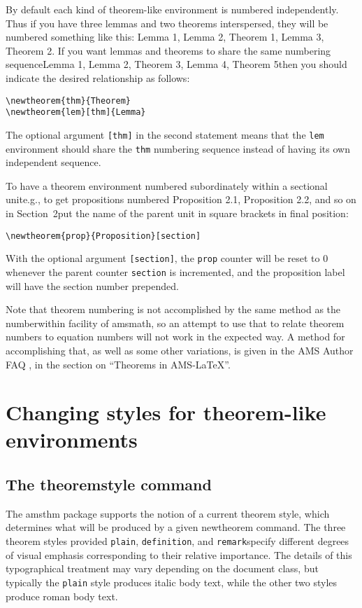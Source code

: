 \documentclass[twoside]{article}
\providecommand{\qq}[1]{\textquotedblleft#1\textquotedblright}
\providecommand{\mdash}{\textemdash\penalty\hyphenpenalty}
\newcommand{\ntt}{%
  \fontfamily\ttdefault \fontseries\mddefault \fontshape\updefault
  \selectfont
}
\DeclareRobustCommand{\cn}[1]{{\ntt\bslchar#1}}
\DeclareRobustCommand{\pkg}[1]{{\ntt#1}}
\begin{document}
By default each kind of theorem-like environment is numbered
independently. Thus if you have three lemmas and two theorems
interspersed, they will be numbered something like this: Lemma 1, Lemma
2, Theorem 1, Lemma 3, Theorem 2. If you want lemmas and theorems to
share the same numbering sequence\mdash Lemma 1, Lemma 2, Theorem 3, Lemma
4, Theorem 5\mdash then you should indicate the desired relationship as
follows:
\begin{verbatim}
\newtheorem{thm}{Theorem}
\newtheorem{lem}[thm]{Lemma}
\end{verbatim}
The optional argument \verb'[thm]' in the second statement means that
the \texttt{lem} environment should share the \texttt{thm} numbering
sequence instead of having its own independent sequence.

To have a theorem environment numbered subordinately within a
sectional unit\mdash e.g., to get propositions numbered Proposition 2.1,
Proposition 2.2, and so on in Section~2\mdash put the name of the parent
unit in square brackets in final position:
\begin{verbatim}
\newtheorem{prop}{Proposition}[section]
\end{verbatim}
With the optional argument \verb'[section]', the \verb'prop' counter
will be reset to 0 whenever the parent counter \verb'section' is
incremented, and the proposition label will have the section number
prepended.

Note that theorem numbering is not accomplished by the same method
as the \cn{numberwithin} facility of \pkg{amsmath}, so an attempt to
use that to relate theorem numbers to equation numbers will not work
in the expected way.  A method for accomplishing that, as well as
some other variations, is given in the AMS Author FAQ \cite{AF},
in the section on \qq{Theorems in AMS-\LaTeX}.


\section{Changing styles for theorem-like environments}

\subsection{The \cn{theoremstyle} command}

The \pkg{amsthm} package supports the notion of a current theorem style,
which determines what will be produced by a given \cn{newtheorem}
command. The three theorem styles provided\mdash
\verb'plain',\relax
{}\relax
{} \verb'definition',
and \verb'remark'\mdash specify different degrees of
visual emphasis corresponding to their relative importance. The
details of this typographical treatment may vary depending on the
document class, but typically the \verb'plain' style produces italic
body text, while the other two styles produce roman body text.
\end{document}
